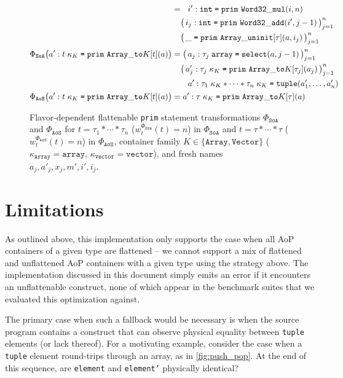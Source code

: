 \begin{figure}[htbp]
\[\begin{aligned}
      &= \phantom{\big(\,} i' : \mathtt{int} \syneq \mathtt{prim\ Word32\_mul}(i, n) \\
      &\phantom{{}=} \big(\, i_j : \mathtt{int} \syneq \mathtt{prim\ Word32\_add}(i', j-1) \,\big)_{j=1}^{n} \\
      &\phantom{{}=} \big(\, \mathtt{\_} \syneq \mathtt{prim\ Array\_uninit}[\tau](a, i_j) \,\big)_{j=1}^{n} \\[2pt]
    \Phi_{\texttt{SoA}}\big(a' : t\;\kappa_K \syneq \mathtt{prim\ Array\_to}K[t](a)\big)
      &= \big(\, a_j : \tau_j\;\mathtt{array} \syneq \mathtt{select}(a, j-1) \,\big)_{j=1}^{n} \\
      &\phantom{{}=} \big(\, a'_j : \tau_j\;\kappa_K \syneq \mathtt{prim\ Array\_to}K[\tau_j](a_j) \,\big)_{j=1}^{n} \\
      &\phantom{{}= \big(\,} a' : \tau_1\;\kappa_K * \cdots * \tau_n\;\kappa_K \syneq \mathtt{tuple}(a'_1, \dots, a'_n) \\
    \Phi_{\texttt{AoS}}\big(a' : t\;\kappa_K \syneq \mathtt{prim\ Array\_to}K[t](a)\big)
      &= a' : \tau\;\kappa_K \syneq \mathtt{prim\ Array\_to}K[\tau](a)
  \end{aligned}
  \]
  \caption{Flavor-dependent flattenable \texttt{prim} statement transformations $\Phi_{\texttt{SoA}}$ and $\Phi_{\texttt{AoS}}$ for $t = \tau_1 * \cdots * \tau_n$ ($w_t^{\Phi_{\texttt{SoA}}}(t) = n$) in $\Phi_{\texttt{SoA}}$ and $t = \tau * \cdots * \tau$ ($w_t^{\Phi_{\texttt{AoS}}}(t) = n$) in $\Phi_{\texttt{AoS}}$, container family $K \in \{\mathtt{Array}, \mathtt{Vector}\}$ ($\kappa_{\mathtt{Array}} = \mathtt{array}$, $\kappa_{\mathtt{Vector}} = \mathtt{vector}$), and fresh names $a_j, a'_j, x_j, m', i', i_j$.}
  \label{fig:shallow_flat_statements}
\end{figure}

\section{Limitations}
As outlined above, this implementation only supports the case when all AoP
containers of a given type are flattened -- we cannot support a mix of flattened
and unflattened AoP containers with a given type using the strategy above. The
implementation discussed in this document simply emits an error if it encounters
an unflattenable construct, none of which appear in the benchmark suites that
we evaluated this optimization against.

The primary case when such a fallback would be necessary is when the source
program contains a construct that can observe physical equality
between \texttt{tuple} elements (or lack thereof). For a motivating example,
consider the case when a \texttt{tuple} element round-trips through an array, as
in \cref{fig:push_pop}. At the end of this sequence, are \texttt{element}
and \texttt{element'} physically identical?


